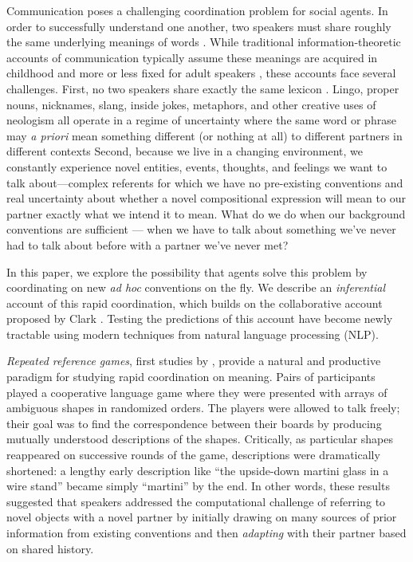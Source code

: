 \documentclass[alpha-refs]{wiley-article}
\begin{document}
Communication poses a challenging coordination problem for social agents. 
In order to successfully understand one another, two speakers must share roughly the same underlying meanings of words \citep{Lewis69_Convention}.
While traditional information-theoretic accounts of communication typically assume these meanings are acquired in childhood and more or less fixed for adult speakers \cite{XXX}, these accounts face several challenges. 
First, no two speakers share exactly the same lexicon \citep{davidson_nice_1986, clark_communal_1998}. 
Lingo, proper nouns, nicknames, slang, inside jokes, metaphors, and other creative uses of neologism all operate in a regime of uncertainty where the same word or phrase may \emph{a priori} mean something different (or nothing at all) to different partners in different contexts \cite{XXX}
Second, because we live in a changing environment, we constantly experience novel entities, events, thoughts, and feelings we want to talk about---complex referents for which we have no pre-existing conventions and real uncertainty about whether a novel compositional expression will mean to our partner exactly what we intend it to mean.
What do we do when our background conventions are sufficient --- when we have to talk about something we've never had to talk about before with a partner we've never met?

In this paper, we explore the possibility that agents solve this problem by coordinating on new \emph{ad hoc} conventions on the fly.
We describe an \emph{inferential} account of this rapid coordination, which builds on the collaborative account proposed by Clark \cite{}.
Testing the predictions of this account have become newly tractable using modern techniques from natural language processing (NLP). 

\emph{Repeated reference games}, first studies by \cite{KraussWeinheimer64_ReferencePhrases}, provide a natural and productive paradigm for studying rapid coordination on meaning.
Pairs of participants played a cooperative language game where they were presented with arrays of ambiguous shapes in randomized orders. 
The players were allowed to talk freely; their goal was to find the correspondence between their boards by producing mutually understood descriptions of the shapes. 
Critically, as particular shapes reappeared on successive rounds of the game, descriptions were dramatically shortened: a lengthy early description like ``the upside-down martini glass in a wire stand'' became simply ``martini'' by the end. 
In other words, these results suggested that speakers addressed the computational challenge of referring to novel objects with a novel partner by initially drawing on many sources of prior information from existing conventions and then \emph{adapting} with their partner based on shared history.
\end{document}
